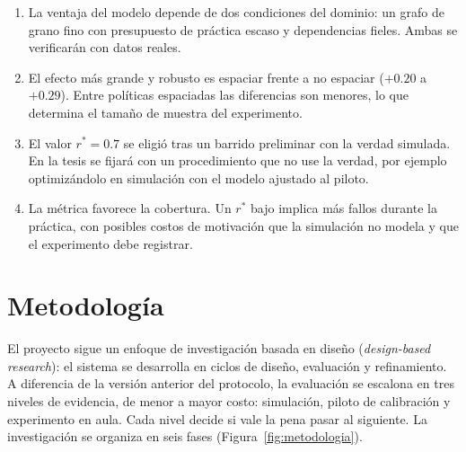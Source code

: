 \documentclass[12pt]{article}
\theoremstyle{definition}
\newcommand{\rstar}{r^{\ast}}
\begin{document}
\begin{enumerate}
\item La ventaja del modelo depende de dos condiciones del dominio: un grafo de grano fino con presupuesto de práctica escaso y dependencias fieles. Ambas se verificarán con datos reales.
\item El efecto más grande y robusto es espaciar frente a no espaciar ($+0.20$ a $+0.29$). Entre políticas espaciadas las diferencias son menores, lo que determina el tamaño de muestra del experimento.
\item El valor $\rstar=0.7$ se eligió tras un barrido preliminar con la verdad simulada. En la tesis se fijará con un procedimiento que no use la verdad, por ejemplo optimizándolo en simulación con el modelo ajustado al piloto.
\item La métrica favorece la cobertura. Un $\rstar$ bajo implica más fallos durante la práctica, con posibles costos de motivación que la simulación no modela y que el experimento debe registrar.
\end{enumerate}

\section{Metodología}
\label{sec:metodologia}

El proyecto sigue un enfoque de investigación basada en diseño (\emph{design-based research}): el sistema se desarrolla en ciclos de diseño, evaluación y refinamiento. A diferencia de la versión anterior del protocolo, la evaluación se escalona en tres niveles de evidencia, de menor a mayor costo: simulación, piloto de calibración y experimento en aula. Cada nivel decide si vale la pena pasar al siguiente. La investigación se organiza en seis fases (Figura~\ref{fig:metodologia}).
\end{document}

